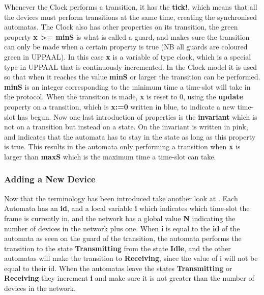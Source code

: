 
Whenever the Clock performs a transition, it has the \textbf{tick!}, which means that all the devices must perform transitions at the same time, creating the synchronised automatas.
The Clock also has other properties on its transition, the green property \textbf{x >= minS} is what is called a guard, and makes sure the transition can only be made when a certain property is true (NB all guards are coloured green in UPPAAL).
In this case \textbf{x} is a variable of type clock, which is a special type in UPPAAL that is continuously incremented.
In the Clock model it is used so that when it reaches the value \textbf{minS} or larger the transition can be performed.
\textbf{minS} is an integer corresponding to the minimum time a time-slot will take in the protocol.
When the transition is made, \textbf{x} is reset to 0, using the \textbf{update} property on a transition, which is \textbf{x:=0} written in blue, to indicate a new time-slot has begun.
Now one last introduction of properties is the \textbf{invariant} which is not on a transition but instead on a state. 
On  the invariant is written in pink, and indicates that the automata has to stay in the state as long as this property is true.
This results in the automata only performing a transition when \textbf{x} is larger than \textbf{maxS} which is the maximum time a time-slot can take.

\subsubsection{Adding a New Device}

Now that the terminology has been introduced take another look at .
Each Automata has an \textbf{id}, and a local variable \textbf{i} which indicates which time-slot the frame is currently in, and the network has a global value \textbf{N} indicating the number of devices in the network plus one.
When \textbf{i} is equal to the \textbf{id} of the automata as seen on the guard of the transition, the automata performs the transition to the state \textbf{Transmitting} from the state \textbf{Idle}, and the other automatas will make the transition to \textbf{Receiving}, since the value of i will not be equal to their id.
When the automatas leave the states \textbf{Transmitting} or \textbf{Receiving} they increment \textbf{i} and make sure it is not greater than the number of devices in the network.

